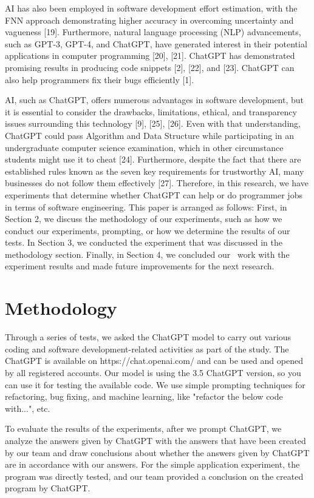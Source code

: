 \documentclass[conference]{IEEEtran}
\begin{document}
AI has also been employed in software development effort estimation, with the FNN approach demonstrating higher accuracy in overcoming uncertainty and vagueness [19]. Furthermore, natural language processing (NLP) advancements, such as GPT-3, GPT-4, and ChatGPT, have generated interest in their potential applications in computer programming [20], [21]. ChatGPT has demonstrated promising results in producing code snippets [2], [22], and [23]. ChatGPT can also help programmers fix their bugs efficiently [1].

AI, such as ChatGPT, offers numerous advantages in software development, but it is essential to consider the drawbacks, limitations, ethical, and transparency issues surrounding this technology [9], [25], [26]. Even with that understanding, ChatGPT could pass Algorithm and Data Structure while participating in an undergraduate computer science examination, which in other circumstance students might use it to cheat [24]. Furthermore, despite the fact that there are established rules known as the seven key requirements for trustworthy AI, many businesses do not follow them effectively [27]. Therefore, in this research, we have experiments that determine whether ChatGPT can help or do programmer jobs in terms of software engineering. This paper is arranged as follows: First, in Section 2, we discuss the methodology of our experiments, such as how we conduct our experiments, prompting, or how we determine the results of our tests. In Section 3, we conducted the experiment that was discussed in the methodology section. Finally, in Section 4, we concluded our  work with the experiment results and made future improvements for the next research.

\section{Methodology}
Through a series of tests, we asked the ChatGPT model to carry out various coding and software development-related activities as part of the study. The ChatGPT is available on https://chat.openai.com/ and can be used and opened by all registered accounts. Our model is using the 3.5 ChatGPT version, so you can use it for testing the available code. We use simple prompting techniques for refactoring, bug fixing, and machine learning, like "refactor the below code with...", etc.

To evaluate the results of the experiments, after we prompt ChatGPT, we analyze the answers given by ChatGPT with the answers that have been created by our team and draw conclusions about whether the answers given by ChatGPT are in accordance with our answers. For the simple application experiment, the program was directly tested, and our team provided a conclusion on the created program by ChatGPT.
\end{document}
